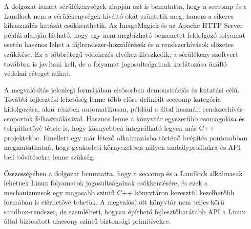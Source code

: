 A dolgozat ismert sérülékenységek alapján azt is bemutatta, hogy a seccomp és a
Landlock nem a sérülékenységek kiváltó okát szüntetik meg, hanem a sikeres
kihasználás hatását csökkenthetik. Az ImageMagick és az Apache HTTP Server
példái alapján látható, hogy egy nem megbízható bemenetet feldolgozó folyamat
esetén hasznos lehet a fájlrendszer-hozzáférések és a rendszerhívások előzetes
szűkítése. Ez a többrétegű védekezés elvéhez illeszkedik: a sérülékeny
szoftvert továbbra is javítani kell, de a folyamat jogosultságainak
korlátozása önálló védelmi réteget adhat.

A megvalósítás jelenlegi formájában elsősorban demonstrációs és kutatási célú.
További fejlesztési lehetőség lenne több előre definiált seccomp kategória
kidolgozása, akár részben automatikusan, például a
 által használt rendszerhívás-csoportok
felhasználásával. Hasznos lenne a könyvtár egyszerűbb csomagolása és
telepíthetővé tétele is, hogy könnyebben integrálható legyen más C++
projektekbe. Emellett egy már létező alkalmazásba történő beépítés pontosabban
megmutathatná, hogy gyakorlati környezetben milyen szabályprofilokra és API-beli
bővítésekre lenne szükség.

Összességében a dolgozat bemutatta, hogy a seccomp és a Landlock alkalmasak
lehetnek Linux folyamatok jogosultságainak csökkentésére, és ezek a
mechanizmusok egy magasabb szintű C++ könyvtáron keresztül kezelhetőbb formában
is elérhetővé tehetők. A megvalósított könyvtár nem teljes körű sandbox-rendszer,
de szemlélteti, hogyan építhető fejlesztőbarátabb API a Linux által biztosított
alacsony szintű biztonsági primitívekre.
